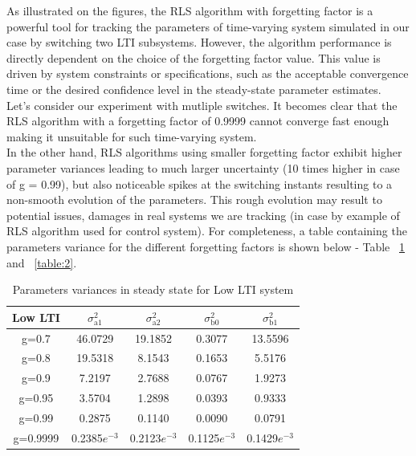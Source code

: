 As illustrated on the figures, the RLS algorithm with forgetting factor is a powerful tool for tracking the parameters of time-varying system simulated 
in our case by switching two LTI subsystems.  However, the algorithm performance is directly dependent on the choice of the forgetting factor value.  This value is driven by system constraints or 
specifications, such as the acceptable convergence time or the desired confidence level in the steady-state parameter estimates.\\
Let's consider our experiment with mutliple switches. It becomes clear that the RLS algorithm with a forgetting factor of 0.9999 cannot
converge fast enough making it unsuitable for such time-varying system.\\
In the other hand, RLS algorithms using smaller forgetting factor exhibit higher parameter variances leading to much larger uncertainty (10 times higher in case of g = 0.99),
 but also noticeable spikes at the switching instants resulting to a non-smooth evolution of the parameters. This rough evolution may result to potential issues, damages in real systems we are tracking (in case by example of RLS algorithm used for control system).
For completeness, a table containing the parameters variance for the different forgetting factors is shown below - Table ~\ref{table:1} and ~\ref{table:2}. 

\begin{table}[h!]
\centering
\begin{tabular}{||c ||c c c c||} 
 \hline 
 Low LTI & $\sigma^2_\text{a1}$ & $\sigma^2_\text{a2}$ & $\sigma^2_\text{b0}$ & $\sigma^2_\text{b1}$ \\ [0.5ex] 
 \hline\hline 
 g=0.7 & 46.0729 & 19.1852 & 0.3077 & 13.5596 \\ 
 \hline
 g=0.8 & 19.5318 & 8.1543 & 0.1653 & 5.5176 \\
 \hline
 g=0.9 & 7.2197 & 2.7688 & 0.0767 & 1.9273 \\
 \hline
 g=0.95 & 3.5704 & 1.2898 & 0.0393 & 0.9333 \\
 \hline
 g=0.99 & 0.2875 & 0.1140 & 0.0090 & 0.0791 \\ 
 \hline
 g=0.9999 & 0.2385$e^{-3}$ & 0.2123$e^{-3}$ & 0.1125$e^{-3}$ & 0.1429$e^{-3}$ \\
 \hline
\end{tabular}
\caption{Parameters variances in steady state for Low LTI system}
\label{table:1}
\end{table}

